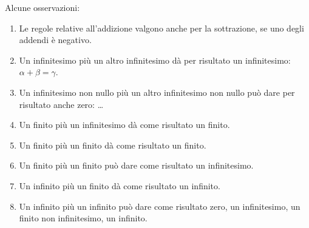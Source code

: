 \begin{multicols}{2}
Alcune osservazioni:

\begin{enumerate} [nosep]
 \item Le regole relative all'addizione valgono anche per la sottrazione, 
se uno degli addendi è negativo. 
 \item Un infinitesimo più un altro infinitesimo dà per risultato un 
infinitesimo: \(\alpha+\beta=\gamma\).
 \item Un infinitesimo non nullo più un altro infinitesimo non nullo può 
dare per risultato anche zero: \dots
 \item Un finito più un infinitesimo dà come risultato un finito.
 \item Un finito più un finito dà come risultato un finito.
 \item Un finito più un finito può dare come risultato un infinitesimo.
 \item Un infinito più un finito dà come risultato un infinito.
 \item Un infinito più un infinito può dare come risultato zero, un 
infinitesimo, un finito non infinitesimo, un infinito.
\end{enumerate}


\begin{center} \scalebox{0.8}{\tabopposto} \end{center}

\begin{center} \scalebox{0.8}{\tabadd} \end{center}

\end{multicols}

